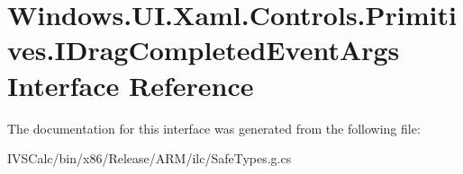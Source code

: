 \hypertarget{interface_windows_1_1_u_i_1_1_xaml_1_1_controls_1_1_primitives_1_1_i_drag_completed_event_args}{}\section{Windows.\+U\+I.\+Xaml.\+Controls.\+Primitives.\+I\+Drag\+Completed\+Event\+Args Interface Reference}
\label{interface_windows_1_1_u_i_1_1_xaml_1_1_controls_1_1_primitives_1_1_i_drag_completed_event_args}


The documentation for this interface was generated from the following file\+:\begin{DoxyCompactItemize}
\item 
I\+V\+S\+Calc/bin/x86/\+Release/\+A\+R\+M/ilc/Safe\+Types.\+g.\+cs\end{DoxyCompactItemize}
